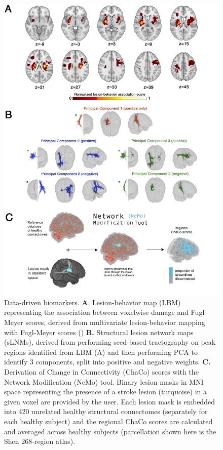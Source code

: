 \documentclass[10pt]{article}
\begin{document}
\begin{figure}[htp]
\centering
\includegraphics[width=0.9\linewidth]{figures/data_driven.png}
\caption{Data-driven biomarkers. \textbf{A}. Lesion-behavior map (LBM) representing the association between voxelwise damage and Fugl Meyer scores, derived from multivariate lesion-behavior mapping with Fugl-Meyer scores (\cite{Bowren2022-rs}) \textbf{B.} Structural lesion network maps (sLNMs), derived from performing seed-based tractography on peak regions identified from LBM (A) and then performing PCA to identify 3 components, split into positive and negative weights. \textbf{C.} Derivation of Change in Connectivity (ChaCo) scores with the Network Modification (NeMo) tool. Binary lesion masks in MNI space representing the presence of a stroke lesion (turquoise) in a given voxel are provided by the user. Each lesion mask is embedded into 420 unrelated healthy structural connectomes (separately for each healthy subject) and the regional ChaCo scores are calculated and averaged across healthy subjects (parcellation shown here is the Shen 268-region atlas). }
\label{M1}
\end{figure}
\end{document}

